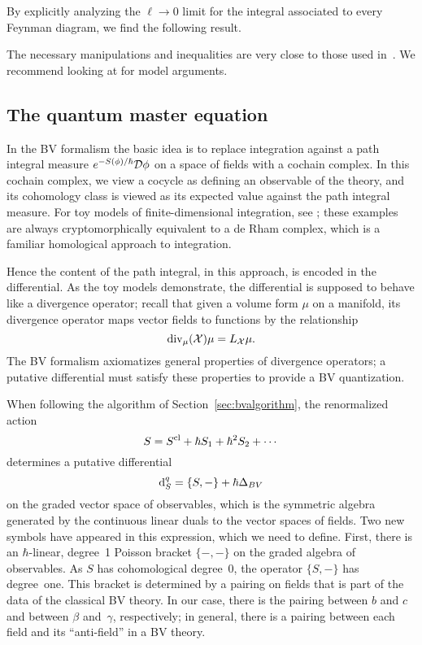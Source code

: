 By explicitly analyzing the $\ell \to 0$ limit for the integral associated to every Feynman diagram,
we find the following result.

\begin{prop}
\end{prop}

The necessary manipulations and inequalities are very close to those used in~\cite{}.
We recommend looking at  for model arguments.


\subsection{The quantum master equation}

In the BV formalism the basic idea is to replace integration against a path integral measure $e^{-S(\phi)/\hbar} \mathcal D \phi$ on a space of fields with a cochain complex.
In this cochain complex, we view a cocycle as defining an observable of the theory,
and its cohomology class is viewed as its expected value against the path integral measure.
For toy models of finite-dimensional integration, see \cite{};
these examples are always cryptomorphically equivalent to a de Rham complex,
which is a familiar homological approach to integration.

Hence the content of the path integral, in this approach, is encoded in the differential.
As the toy models demonstrate, 
the differential is supposed to behave like a divergence operator;
recall that given a volume form $\mu$ on a manifold, 
its divergence operator maps vector fields to functions by the relationship
\[
{\rm div}_\mu({\mathcal X}) \mu = L_{\mathcal X} \mu.
\] 
The BV formalism axiomatizes general properties of divergence operators;
a putative differential must satisfy these properties to provide a BV quantization.

When following the algorithm of Section~\ref{sec:bvalgorithm},
the renormalized action
\[
S = S^{\rm cl} + \hbar S_1 + \hbar^2 S_2 + \cdots
\]
determines a putative differential 
\[
{\rm d}^q_S=\{S,-\} + \hbar\Delta_{BV}
\]
on the graded vector space of observables,
which is the symmetric algebra generated by the continuous linear duals to the vector spaces of fields.
Two new symbols have appeared in this expression, which we need to define.
First, there is an $\hbar$-linear, degree~1 Poisson bracket $\{-,-\}$ on the graded algebra of observables.
As $S$ has cohomological degree~0, the operator $\{S,-\}$ has degree~one.
This bracket is determined by a pairing on fields that is part of the data of the classical BV theory. 
In our case, there is the pairing between $b$ and $c$ and between $\beta$ and~$\gamma$, respectively;
in general, there is a pairing between each field and its ``anti-field'' in a BV theory.


